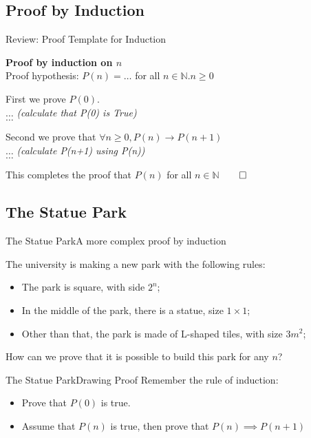 \subsection{Proof by Induction}
\begin{frame}{Review: Proof Template for Induction}

  {\larger
    {\bf Proof by induction on $n$}\\
    Proof hypothesis: $P(n) = \ldots$ for all $n \in \mathbb{N}. n \geq 0$\\

    \bigskip

    First we prove $P(0)$.\\
    $\ldots$ \emph{(calculate that P(0) is True)}\\
    $\ldots$\\

    \bigskip

    Second we prove that $\forall n \geq 0, P(n) \rightarrow P(n+1)$\\
    $\ldots$ \emph{(calculate P(n+1) using P(n))}\\
    $\ldots$\\

    \bigskip

    This completes the proof that $P(n)$ for all $n\in\mathbb{N}$\hfill$\qed$
  }
\end{frame}

\subsection{The Statue Park}

\begin{frame}{The Statue Park}{A more complex proof by induction}

  The university is making a new park with the following rules:
  \begin{itemize}
    \item The park is square, with side $2^n$;
    \item In the middle of the park, there is a statue, size $1\times 1$;
    \item Other than that, the park is made of L-shaped tiles, with size $3m^2$;
  \end{itemize}\bigskip

  How can we prove that it is possible to build this park for any $n$?
\end{frame}

\begin{frame}[t]{The Statue Park}{Drawing Proof}
  Remember the rule of induction:
  \begin{itemize}
    \item Prove that $P(0)$ is true.
    \item Assume that $P(n)$ is true, then prove that $P(n) \implies P(n+1)$
  \end{itemize}
\end{frame}


